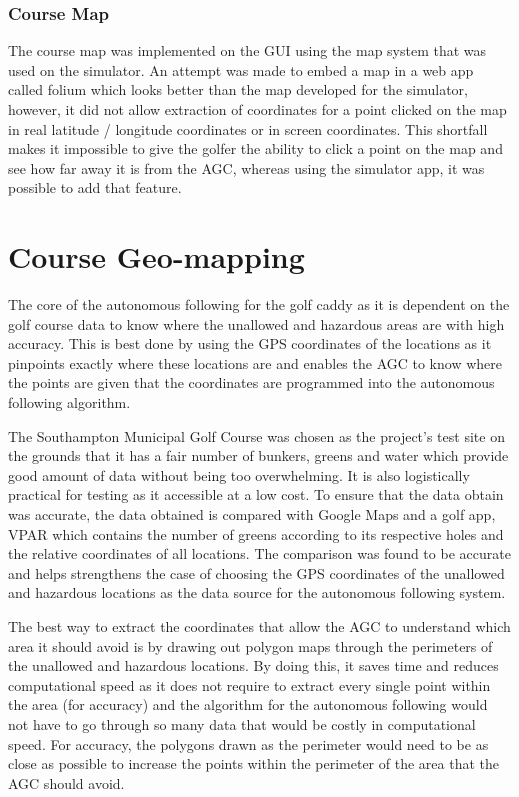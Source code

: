 \documentclass[11pt,landscape]{article}
\begin{document}
\begin{multicols}{3}
\subsubsection{Course Map}
The course map was implemented on the GUI using the map system that was used on
the simulator. An attempt was made to embed a map in a web app called folium which looks
better than the map developed for the simulator, however, it did not allow
extraction of coordinates for a point clicked on the map in real latitude / longitude
coordinates or in screen coordinates. This shortfall makes it impossible to give
the golfer the ability to click a point on the map and see how far away it is
from the AGC, whereas using the simulator app, it was possible to add that feature.

\section{Course Geo-mapping}
The core of the autonomous following for the golf caddy as it is dependent on the
golf course data to know where the unallowed and hazardous areas are with high
accuracy. This is best done by using the GPS coordinates of the locations as it
pinpoints exactly where these locations are and enables the AGC to know where
the points are given that the coordinates are programmed into the autonomous
following algorithm.

The Southampton Municipal Golf Course was chosen as the project’s test site on
the grounds that it has a fair number of bunkers, greens and water which provide
good amount of data without being too overwhelming. It is also logistically
practical for testing as it accessible at a low cost. To ensure that the data
obtain was accurate, the data obtained is compared with Google Maps and a golf
app, VPAR which contains the number of greens according to its respective holes
and the relative coordinates of all locations. The comparison was found to be
accurate and helps strengthens the case of choosing the GPS coordinates of the
unallowed and hazardous locations as the data source for the autonomous
following system. 

The best way to extract the coordinates that allow the AGC to understand which
area it should avoid is by drawing out polygon maps through the perimeters of
the unallowed and hazardous locations. By doing this, it saves time and reduces
computational speed as it does not require to extract every single point within
the area (for accuracy) and the algorithm for the autonomous following would not
have to go through so many data that would be costly in computational speed. For
accuracy, the polygons drawn as the perimeter would need to be as close as possible
to increase the points within the perimeter of the area that the AGC should avoid.


\end{multicols}
\end{document}
